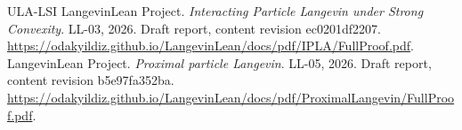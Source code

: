 \documentclass[11pt,a4paper]{article}
\begin{document}
\begin{thebibliography}{ULA-LSI}
LangevinLean Project. \emph{Interacting Particle Langevin under Strong Convexity}. LL-03, 2026. Draft report, content revision ec0201df2207. \url{https://odakyildiz.github.io/LangevinLean/docs/pdf/IPLA/FullProof.pdf}.
LangevinLean Project. \emph{Proximal particle Langevin}. LL-05, 2026. Draft report, content revision b5e97fa352ba. \url{https://odakyildiz.github.io/LangevinLean/docs/pdf/ProximalLangevin/FullProof.pdf}.
\end{thebibliography}
\end{document}
